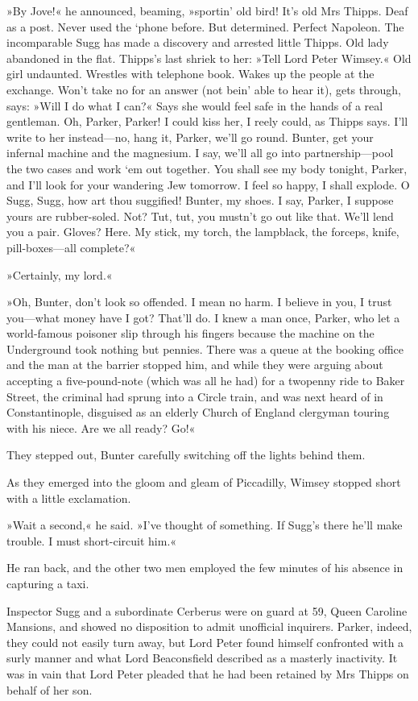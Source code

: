 »By Jove!« he announced, beaming, »sportin' old bird! It's old Mrs Thipps. Deaf as a post. Never used the `phone before. But determined. Perfect Napoleon. The incomparable Sugg has made a discovery and arrested little Thipps. Old lady abandoned in the flat. Thipps's last shriek to her: »Tell Lord Peter Wimsey.« Old girl undaunted. Wrestles with telephone book. Wakes up the people at the exchange. Won't take no for an answer (not bein' able to hear it), gets through, says: »Will I do what I can?« Says she would feel safe in the hands of a real gentleman. Oh, Parker, Parker! I could kiss her, I reely could, as Thipps says. I'll write to her instead—no, hang it, Parker, we'll go round. Bunter, get your infernal machine and the magnesium. I say, we'll all go into partnership—pool the two cases and work `em out together. You shall see my body tonight, Parker, and I'll look for your wandering Jew tomorrow. I feel so happy, I shall explode. O Sugg, Sugg, how art thou suggified! Bunter, my shoes. I say, Parker, I suppose yours are rubber-soled. Not? Tut, tut, you mustn't go out like that. We'll lend you a pair. Gloves? Here. My stick, my torch, the lampblack, the forceps, knife, pill-boxes—all complete?«

»Certainly, my lord.«

»Oh, Bunter, don't look so offended. I mean no harm. I believe in you, I trust you—what money have I got? That'll do. I knew a man once, Parker, who let a world-famous poisoner slip through his fingers because the machine on the Underground took nothing but pennies. There was a queue at the booking office and the man at the barrier stopped him, and while they were arguing about accepting a five-pound-note (which was all he had) for a twopenny ride to Baker Street, the criminal had sprung into a Circle train, and was next heard of in Constantinople, disguised as an elderly Church of England clergyman touring with his niece. Are we all ready? Go!«

They stepped out, Bunter carefully switching off the lights behind them.

As they emerged into the gloom and gleam of Piccadilly, Wimsey stopped short with a little exclamation.

»Wait a second,« he said. »I've thought of something. If Sugg's there he'll make trouble. I must short-circuit him.«

He ran back, and the other two men employed the few minutes of his absence in capturing a taxi.

Inspector Sugg and a subordinate Cerberus were on guard at 59, Queen Caroline Mansions, and showed no disposition to admit unofficial inquirers. Parker, indeed, they could not easily turn away, but Lord Peter found himself confronted with a surly manner and what Lord Beaconsfield described as a masterly inactivity. It was in vain that Lord Peter pleaded that he had been retained by Mrs Thipps on behalf of her son.

